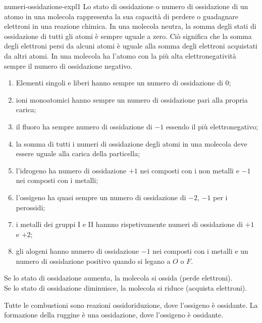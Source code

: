 \documentclass[preview]{standalone}
\begin{document}
\begin{snippet}{numeri-ossidazione-expl1}
Lo stato di ossidazione o numero di ossidazione di un atomo in una molecola rappresenta la sua capacità di perdere o guadagnare
elettroni in una reazione chimica. In una molecola neutra, la somma degli stati di ossidazione di tutti gli atomi è
sempre uguale a zero. Ciò significa che la somma degli elettroni persi da alcuni atomi è uguale alla somma
degli elettroni acquistati da altri atomi. In una molecola ha l'atomo con la più alta elettronegatività
sempre il numero di ossidazione negativo.

\begin{enumerate}
    \item Elementi singoli e liberi hanno sempre un numero di ossidazione di \(0\);
    \item ioni monoatomici hanno sempre un numero di ossidazione pari alla propria carica;
    \item il fluoro ha sempre numero di ossidazione di \(-1\) essendo il più elettronegativo;
    \item la somma di tutti i numeri di ossidazione degli atomi in una molecola deve essere
        uguale alla carica della particella;
    \item l'idrogeno ha numero di ossidazione \(+1\) nei composti con i non metalli e \(-1\)
        nei composti con i metalli;
    \item l'ossigeno ha quasi sempre un numero di ossidazione di \(-2\), \(-1\) per i perossidi;
    \item i metalli dei gruppi I e II hannno rispetivamente numeri di ossidazione di \(+1\) e \(+2\);
    \item gli alogeni hanno numero di ossidazione \(-1\) nei composti con i metalli e un numero di ossidazione
        positivo quando si legano a \(O\) o \(F\).
\end{enumerate}


Se lo stato di ossidazione aumenta, la molecola si ossida (perde elettroni). \\
Se lo stato di ossidazione diminuisce, la molecola si riduce (acquista elettroni).

Tutte le combustioni sono reazioni ossidoriduzione, dove l'ossigeno è ossidante.
La formazione della ruggine è una ossidazione, dove l'ossigeno è ossidante.
\end{snippet}
\end{document}
